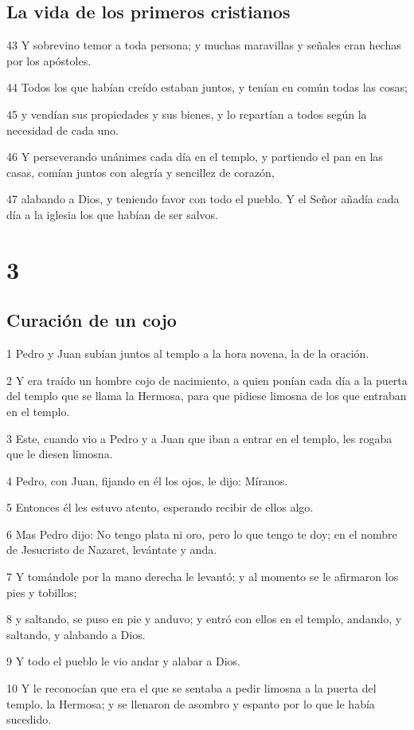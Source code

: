 \section*{La vida de los primeros cristianos}

\par 43 Y sobrevino temor a toda persona; y muchas maravillas y señales eran hechas por los apóstoles.
\par 44 Todos los que habían creído estaban juntos, y tenían en común todas las cosas;
\par 45 y vendían sus propiedades y sus bienes, y lo repartían a todos según la necesidad de cada uno.
\par 46 Y perseverando unánimes cada día en el templo, y partiendo el pan en las casas, comían juntos con alegría y sencillez de corazón,
\par 47 alabando a Dios, y teniendo favor con todo el pueblo. Y el Señor añadía cada día a la iglesia los que habían de ser salvos.

\chapter{3}

\section*{Curación de un cojo}

\par 1 Pedro y Juan subían juntos al templo a la hora novena, la de la oración.
\par 2 Y era traído un hombre cojo de nacimiento, a quien ponían cada día a la puerta del templo que se llama la Hermosa, para que pidiese limosna de los que entraban en el templo.
\par 3 Este, cuando vio a Pedro y a Juan que iban a entrar en el templo, les rogaba que le diesen limosna.
\par 4 Pedro, con Juan, fijando en él los ojos, le dijo: Míranos.
\par 5 Entonces él les estuvo atento, esperando recibir de ellos algo.
\par 6 Mas Pedro dijo: No tengo plata ni oro, pero lo que tengo te doy; en el nombre de Jesucristo de Nazaret, levántate y anda.
\par 7 Y tomándole por la mano derecha le levantó; y al momento se le afirmaron los pies y tobillos;
\par 8 y saltando, se puso en pie y anduvo; y entró con ellos en el templo, andando, y saltando, y alabando a Dios.
\par 9 Y todo el pueblo le vio andar y alabar a Dios.
\par 10 Y le reconocían que era el que se sentaba a pedir limosna a la puerta del templo, la Hermosa; y se llenaron de asombro y espanto por lo que le había sucedido.

